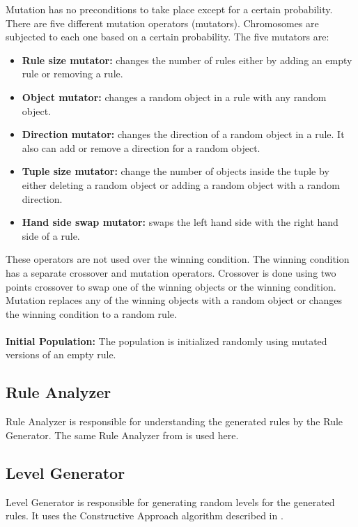 Mutation has no preconditions to take place except for a certain probability. There are five different mutation operators (mutators). Chromosomes are subjected to each one based on a certain probability. The five mutators are:
\begin{itemize} \itemsep0pt \parskip0pt 
	\item \textbf{Rule size mutator:} changes the number of rules either by adding an empty rule or removing a rule.
	\item \textbf{Object mutator:} changes a random object in a rule with any random object.
	\item \textbf{Direction mutator:} changes the direction of a random object in a rule. It also can add or remove a direction for a random object.
	\item \textbf{Tuple size mutator:} change the number of objects inside the tuple by either deleting a random object or adding a random object with a random direction.
	\item \textbf{Hand side swap mutator:} swaps the left hand side with the right hand side of a rule.
\end{itemize}

These operators are not used over the winning condition. The winning condition has a separate crossover and mutation operators. Crossover is done using two points crossover to swap one of the winning objects or the winning condition. Mutation replaces any of the winning objects with a random object or changes the winning condition to a random rule.\\\\
\textbf{Initial Population:} The population is initialized randomly using mutated versions of an empty rule.

\subsection{Rule Analyzer}
Rule Analyzer is responsible for understanding the generated rules by the Rule Generator. The same Rule Analyzer from  is used here.

\subsection{Level Generator}
Level Generator is responsible for generating random levels for the generated rules. It uses the Constructive Approach algorithm described in .

